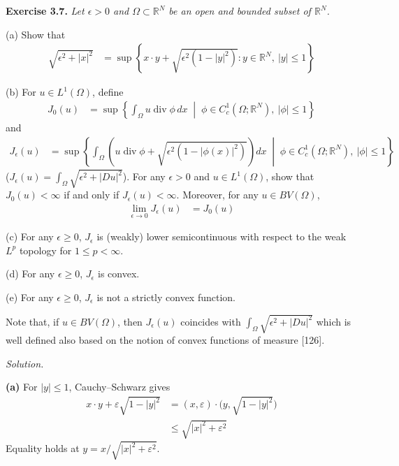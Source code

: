 \documentclass[12pt,letterpaper]{article}
\newcommand{\eps}{\varepsilon}
\newcommand{\exercise}[1]{%
  \par\bigskip\noindent\textbf{Exercise #1.}\enspace}
\newenvironment{statement}{\itshape\ignorespaces}{\par}
\newcommand{\solution}{\par\medskip\noindent\textit{Solution.}\enspace}
\newcommand{\partlabel}[1]{\par\medskip\noindent\textbf{(#1)}\enspace}
\begin{document}
\newpage
\begin{samepage}
\exercise{3.7}
\begin{statement}
Let $\epsilon>0$ and $\Omega\subset\mathbb R^N$ be an open and bounded subset of $\mathbb R^N$.
\par\smallskip
(a) Show that
\begin{align*}
\sqrt{\epsilon^2+|x|^2}
&=\sup\left\{x\cdot y+\sqrt{\epsilon^2(1-|y|^2)}:
        y\in\mathbb R^N,\ |y|\le1\right\}
\end{align*}
\par\smallskip
(b) For $u\in L^1(\Omega)$, define
\begin{align*}
J_0(u)
&=\sup\left\{\int_\Omega u\operatorname{div}\phi\,dx
       \;\middle|\;\phi\in C_c^1(\Omega;\mathbb R^N),\ |\phi|\le1\right\}
\end{align*}
and
\begin{align*}
J_\epsilon(u)
&=\sup\left\{\int_\Omega
 \left(u\operatorname{div}\phi+\sqrt{\epsilon^2(1-|\phi(x)|^2)}\right)dx
 \;\middle|\;\phi\in C_c^1(\Omega;\mathbb R^N),\ |\phi|\le1\right\}
\end{align*}
($J_\epsilon(u)=\int_\Omega\sqrt{\epsilon^2+|Du|^2}$).
For any $\epsilon>0$ and $u\in L^1(\Omega)$, show that $J_0(u)<\infty$
if and only if $J_\epsilon(u)<\infty$. Moreover, for any $u\in BV(\Omega)$,
\begin{align*}
\lim_{\epsilon\to0}J_\epsilon(u)&=J_0(u)
\end{align*}
\par\smallskip
(c) For any $\epsilon\ge0$, $J_\epsilon$ is (weakly) lower semicontinuous with respect to the weak $L^p$ topology for $1\le p<\infty$.
\par\smallskip
(d) For any $\epsilon\ge0$, $J_\epsilon$ is convex.
\par\smallskip
(e) For any $\epsilon\ge0$, $J_\epsilon$ is not a strictly convex function.
\par\smallskip
Note that, if $u\in BV(\Omega)$, then $J_\epsilon(u)$ coincides with
$\int_\Omega\sqrt{\epsilon^2+|Du|^2}$ which is well defined also based on the notion of convex functions of measure [126].
\end{statement}
\end{samepage}

\solution
\partlabel{a}
For $|y|\le1$, Cauchy--Schwarz gives
\begin{align*}
 x\cdot y+\eps\sqrt{1-|y|^2}
 &=(x,\eps)\cdot\bigl(y,\sqrt{1-|y|^2}\bigr)\\
 &\le\sqrt{|x|^2+\eps^2}
\end{align*}
Equality holds at $y=x/\sqrt{|x|^2+\eps^2}$.
\end{document}
